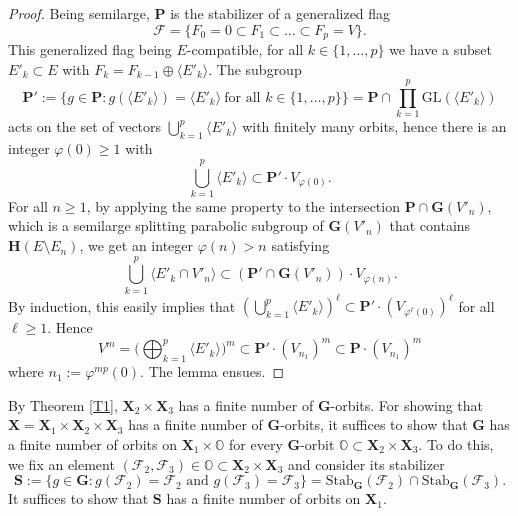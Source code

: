 \documentclass[12pt]{amsart}
\newcommand{\GL}{\mathrm{GL}}
\newcommand{\G}{\mathbf{G}}
\renewcommand{\H}{\mathbf{H}}
\renewcommand{\P}{\mathbf{P}}
\newcommand{\X}{\mathbf{X}}
\newcommand{\Ff}{\mathcal{F}}
\renewcommand{\span}[1]{\langle #1\rangle}
\newcommand{\Stab}{\mathrm{Stab}}
\numberwithin{equation}{section}
\theoremstyle{definition}
\begin{document}
\begin{proof}
Being semilarge, $\P$ is the stabilizer of a generalized flag
\[
\Ff=\{F_0=0\subset F_1\subset\ldots\subset F_p=V\}.
\]
This generalized flag being $E$-compatible,
for all $k\in\{1,\ldots,p\}$ we have a subset $E'_k\subset E$ with $F_k=F_{k-1}\oplus\span{E'_k}$.
The subgroup
\[
\P':=\{g\in\P:g(\span{E'_k})=\span{E'_k}\ \mbox{for all $k\in\{1,\ldots,p\}$}\}=\P\cap\prod_{k=1}^p\GL(\span{E'_k})
\]
acts on the set of vectors
$\bigcup_{k=1}^p\span{E'_k}$
with finitely many orbits, hence there is an integer $\varphi(0)\geq 1$ with
\[
\bigcup_{k=1}^p\span{E'_k}\subset \P'\cdot V_{\varphi(0)}.
\]
For all $n\geq 1$, by applying the same property to the intersection $\P\cap\G(V'_n)$, which is a semilarge splitting parabolic subgroup of $\G(V'_n)$ that contains $\H(E\setminus E_n)$, we get an integer $\varphi(n)>n$ satisfying
\[
\bigcup_{k=1}^p\span{E'_k\cap V'_n}\subset (\P'\cap \G(V'_n))\cdot V_{\varphi(n)}.
\]
By induction, this easily implies that $(\bigcup_{k=1}^p\span{E'_k})^\ell\subset \P'\cdot (V_{\varphi^\ell(0)})^\ell$ for all $\ell\geq 1$. 
Hence
\[V^m=\Big(\bigoplus_{k=1}^p\span{E'_k}\Big)^m\subset \P'\cdot (V_{n_1})^{m}\subset \P\cdot (V_{n_1})^{m}\]
where $n_1:=\varphi^{mp}(0)$.
The lemma ensues.
\end{proof}


By Theorem \ref{T1}, $\X_2\times \X_3$ has a finite number of $\G$-orbits. For showing that $\X=\X_1\times\X_2\times\X_3$ has a finite number of $\G$-orbits,
it suffices to show that $\G$ has a finite number of orbits on $\X_1\times\mathbb{O}$ for every $\G$-orbit $\mathbb{O}\subset\X_2\times\X_3$.
To do this, we fix an element $(\Ff_2,\Ff_3)\in\mathbb{O}\subset\X_2\times\X_3$ and consider its stabilizer
\[\mathbf{S}:=\{g\in\G:g(\Ff_2)=\Ff_2\mbox{ and }g(\Ff_3)=\Ff_3\}=\Stab_\G(\Ff_2)\cap\Stab_\G(\Ff_3).\]
It suffices to show that $\mathbf{S}$ has a finite number of orbits on $\X_1$.
\end{document}
